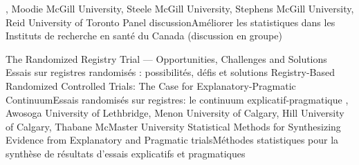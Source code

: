 
{
,  {Moodie}
{McGill University},  {Steele}
{McGill University},  {Stephens}
{McGill University},  {Reid}
{University of Toronto}
}
{Panel discussion}{Améliorer les statistiques dans les Instituts de recherche en santé du Canada (discussion en groupe)}
{\bubbleE \enspace \screenE}


{
}
{The Randomized Registry Trial — Opportunities, Challenges and Solutions }{Essais sur registres randomisés : possibilités, défis et solutions}
{\bubbleE \enspace \screenE}
{
}
{Registry-Based Randomized Controlled Trials: The Case for Explanatory-Pragmatic Continuum}{Essais randomisés sur registres: le continuum explicatif-pragmatique}
{\bubbleE \enspace \screenE}
{
,  {Awosoga}
{University of Lethbridge},  {Menon}
{University of Calgary},  {Hill}
{University of Calgary},  {Thabane}
{McMaster University}
}
{Statistical Methods for Synthesizing Evidence from Explanatory and Pragmatic trials}{Méthodes statistiques pour la synthèse de résultats d’essais explicatifs et pragmatiques}
{\bubbleE \enspace \screenE}


